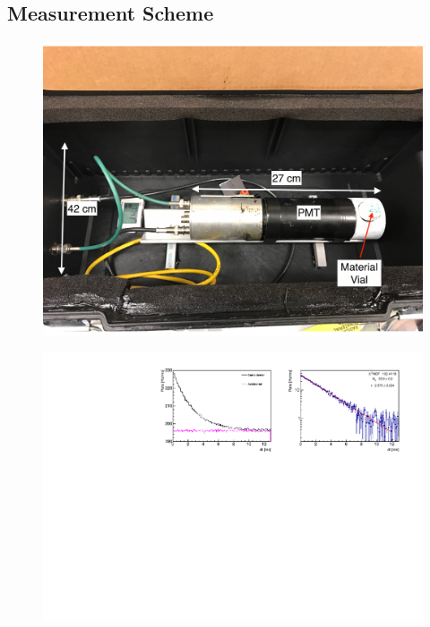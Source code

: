 \subsection{Measurement Scheme}

\begin{figure}[H]
	\centering
	\includegraphics[width=0.7\linewidth]{tex/6-ac227-images/BNL/BlackBox}
	\caption{}
	\label{fig:blackbox}
\end{figure}


\begin{figure}[H]
	\centering
	\includegraphics[width=1.\linewidth]{"tex/6-ac227-images/BNL/RnPoDt_TimeBin23_S2"}
	\caption{}
	\label{fig:rnpodttimebin23s2}
\end{figure}

